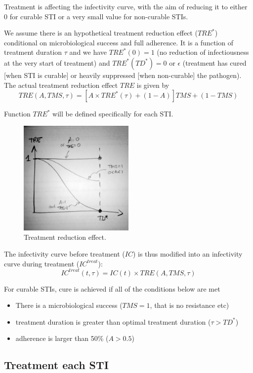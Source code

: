 \documentclass[11pt, onecolumn]{article}
\begin{document}
Treatment is affecting the infectivity curve, with the aim of reducing it to either 0 for curable STI or a very small value for non-curable STIs. 

We assume there is an hypothetical treatment reduction effect ($TRE^*$) conditional on microbiological success and full adherence. It is a function of treatment duration $\tau$ and we have $TRE^*(0)=1$ (no reduction of infectiousness at the very start of treatment) and $TRE^*(TD^*)=0$ or $\epsilon$ (treatment has cured [when STI is curable] or heavily suppressed [when non-curable] the pathogen). The actual treatment reduction effect $TRE$ is given by
$$TRE(A, TMS,\tau) = \left[A\times TRE^*(\tau) + (1-A) \right] TMS + (1-TMS) $$

Function $TRE^*$ will be defined specifically for each STI.

\begin{figure}[!ht]
\centering
    \includegraphics[angle=0,width=0.5\textwidth]{TRE.JPG}
\caption{Treatment reduction effect.}
\label{fig:TRE}
\end{figure}

The infectivity curve before treatment ($IC$) is thus modified into an infectivity curve during treatment ($IC^{treat}$):
$$IC^{treat}(t,\tau)= IC(t)\times TRE(A,TMS,\tau)  $$

For curable STIs, cure is achieved if all of the conditions below are met
\begin{itemize}
\item There is a microbiological success ($TMS=1$, that is no resistance etc)
\item treatment duration is greater than optimal treatment duration ($\tau>TD^*$)
\item adherence is larger than 50\% ($A>0.5$) 
\end{itemize}


\subsection{Treatment each STI}
\end{document}
